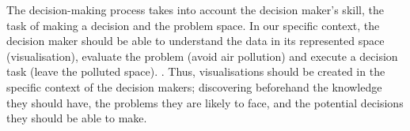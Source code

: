 The decision-making process takes into account the decision maker's skill, the task of making a decision and the problem space. In our specific context, the decision maker should be able to understand the data in its represented space (visualisation), evaluate the problem (avoid air pollution) and execute a decision task (leave the polluted space).  \cite{Zhu2008}. Thus, visualisations should be created in the specific context of the decision makers; discovering beforehand the knowledge they should have, the problems they are likely to face, and the potential decisions they should be able to make. 
